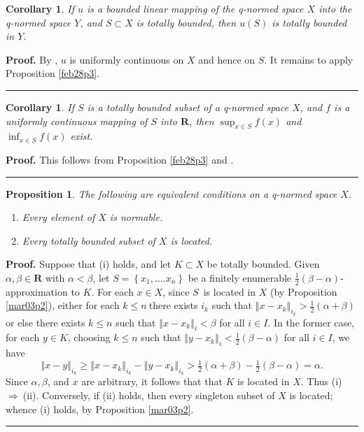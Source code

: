 \documentclass[11pt]{article}%
\newtheorem{corollary}[theorem]{Corollary}
\newtheorem{proposition}[theorem]{Proposition}
\newenvironment{proof}[1][Proof]{\noindent\textbf{#1.} }{\ \rule{0.5em}{0.5em}}
\begin{document}
\begin{corollary}
\label{feb28c1}If $u$ is a bounded linear mapping of the q-normed space $X$
into the q-normed space $Y$, and $S\subset X$ is totally bounded, then $u(S) $
is totally bounded in $Y$.
\end{corollary}

\begin{proof}
By \cite[Chapter 7, (5.6)]{BB}, $u$ is uniformly continuous on $X$ and hence
on $S$. It remains to apply Proposition \ref{feb28p3}.
\end{proof}

\begin{corollary}
\label{feb28c2}If $S$ is a totally bounded subset of a q-normed space $X$, and
$f$ is a uniformly continuous mapping of $S$ into $\mathbf{R}$, then
$\sup_{x\in S}f(x)$ and $\inf_{x\in S}f(x)$ exist.
\end{corollary}

\begin{proof}
This follows from Proposition \ref{feb28p3} and \cite[Proposition
2.2.5]{BVtech}.
\end{proof}

\begin{proposition}
\label{mar0326}The following are equivalent conditions on a q-normed space
$X.$

\begin{enumerate}
\item[\emph{(i)}] Every element of $X$ is normable.

\item[\emph{(ii)}] Every totally bounded subset of $X$ is located.
\end{enumerate}
\end{proposition}

\begin{proof}
Suppose that (i) holds, and let $K\subset X$ be totally bounded. Given
$\alpha,\beta\in\mathbf{R}$ with $\alpha<\beta$, let $S=\left\{  x_{1}%
,\ldots.x_{n}\right\}  $ be a finitely enumerable $\frac{1}{2}(\beta-\alpha
)$-approximation to $K$. For each $x\in X$, since $S$\ is located in $X$ (by
Proposition \ref{mar03p2}), either for each $k\leq n\ $there exists $i_{k}$
such that $\left\Vert x-x_{k}\right\Vert _{i_{k}}>\frac{1}{2}(\alpha+\beta)$
or else there exists $k\leq n$ such that $\left\Vert x-x_{k}\right\Vert
_{i}<\beta$ for all $i\in I$. In the former case, for each $y\in K$, choosing
$k\leq n$ such that $\left\Vert y-x_{k}\right\Vert _{i}<\frac{1}{2}%
(\beta-\alpha)$ for all $i\in I$, we have%
\[
\left\Vert x-y\right\Vert _{i_{k}}\geq\left\Vert x-x_{k}\right\Vert _{i_{k}%
}-\left\Vert y-x_{k}\right\Vert _{i_{k}}>\tfrac{1}{2}(\alpha+\beta)-\tfrac
{1}{2}(\beta-\alpha)=\alpha.
\]
Since $\alpha,\beta$, and $x$ are arbitrary, it follows that that $K$ is
located in $X$. Thus (i)\ $\Rightarrow\ $(ii). Conversely, if (ii) holds, then
every singleton subset of $X$ is located; whence (i) holds, by Proposition
\ref{mar03p2}.
\end{proof}
\end{document}
